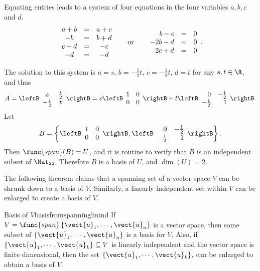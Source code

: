 \begin{solution}
Equating entries leads to a system of four equations in the four
variables $a,b,c$ and $d$.
\[ \begin{array}{ccc}
a+b & = & a + c \\
-b & = & b + d \\
c + d & = & -c \\
-d & = & -d \end{array} \hspace*{.2in}\mbox{ or }\hspace*{.2in}
\begin{array}{rcc}
b - c & = & 0 \\
-2b - d & = & 0 \\
2c + d & = & 0 
\end{array}.  \] 

The solution to this system is
$a=s$, $b=-\frac{1}{2}t$, $c=-\frac{1}{2}t$,  $d=t$ for any $s,t\in\R$, 
and thus 
\[ A=\leftB\begin{array}{cc} s & \frac{t}{2} \\
-\frac{t}{2} & t \end{array}\rightB
= s\leftB\begin{array}{cc} 1 & 0 \\ 0 & 0 \end{array}\rightB
+ t\leftB\begin{array}{rr} 0  & -\frac{1}{2} \\ 
-\frac{1}{2} & 1 \end{array}\rightB .\]
Let 
\[ B=\left\{ 
\leftB\begin{array}{cc} 1 & 0 \\ 0 & 0 \end{array}\rightB,
\leftB\begin{array}{rr} 0  & -\frac{1}{2} \\
-\frac{1}{2} & 1 \end{array}\rightB\right\}.\]
Then $\func{span}(B)=U$, and it is routine to verify that $B$ is
an independent subset of $\Mat_{22}$.  
Therefore $B$ is a basis of $U$, and $\dim(U)=2$.
\end{solution}

The following theorem claims that a spanning set of a vector space $V$ can be shrunk down to a basis of $V$. Similarly, a linearly independent set within $V$ can be enlarged to create a basis of $V$.

\begin{theorem}{Basis of $V$}{basisfromspanninglinind}
 If $V=\func{span}\left\{ \vect{u}_{1},\cdots ,\vect{u}
_{n}\right\} $ is a vector space, then some subset of $\{\vect{u}_{1},\cdots ,\vect{u}_{n}\}$
is a basis for $V.$ Also, if $\{\vect{u}_{1},\cdots ,\vect{u}
_{k}\}\subseteq V$ is linearly independent and the vector space is finite
dimensional,
then the set $\{
\vect{u}_{1},\cdots ,\vect{u}_{k}\},$ can be enlarged to obtain a basis
of $V$.
\end{theorem}

